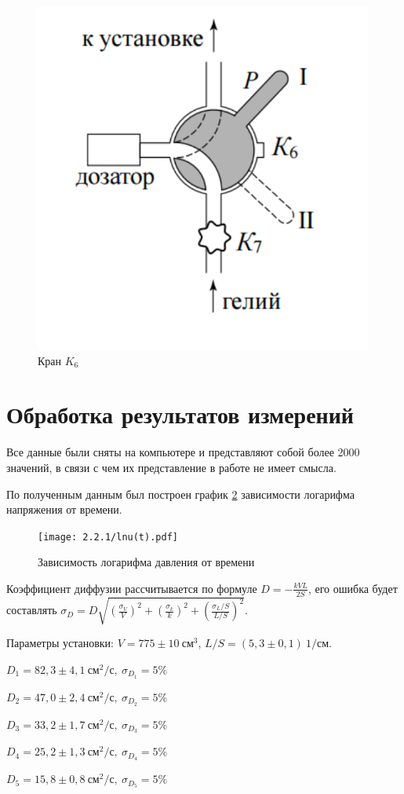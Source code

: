 \documentclass[a4paper,12pt]{article} %
\begin{document}
\begin{figure}[H]
    \centering
    \includegraphics[width=7.5 cm]{crane.PNG}
    \caption{Кран $K_6$}
    \label{fig:vac}
\end{figure}

\section{Обработка результатов измерений}

Все данные были сняты на компьютере и представляют собой более 2000 значений, в связи с чем их представление в работе не имеет смысла.

По полученным данным был построен график \ref{lnu(t)} зависимости логарифма напряжения от времени.

\begin{figure}[H]
    \centering
    \texttt{[image: 2.2.1/lnu(t).pdf]}
    \caption{Зависимость логарифма давления от времени}
    \label{lnu(t)}
\end{figure}

Коэффициент диффузии рассчитывается по формуле $\displaystyle D = -\frac{kVL}{2S}$, его ошибка будет составлять $\displaystyle \sigma_D = D\sqrt{\left(\frac{\sigma_V}{V}\right)^2+\left(\frac{\sigma_k}{k}\right)^2+\left(\frac{\sigma_L/S}{L/S}\right)^2}$.

Параметры установки: $V = 775 \pm 10\ \mbox{см}^3$, $L/S = (5,3 \pm 0,1)\ 1/$см.

\begin{center}
$\displaystyle    D_1 = 82,3 \pm 4,1\ \mbox{см}^2/\mbox{с},\ \sigma_{D_1} = 5\%$
\break

$\displaystyle     D_2 = 47,0 \pm 2,4\  \mbox{см}^2/\mbox{с},\ \sigma_{D_2} = 5\%$
\break

$\displaystyle     D_3 = 33,2 \pm 1,7\  \mbox{см}^2/\mbox{с},\  \sigma_{D_3} = 5\%$
\break

$\displaystyle     D_4 = 25,2 \pm 1,3\  \mbox{см}^2/\mbox{с},\  \sigma_{D_4} = 5\%$
\break

$\displaystyle     D_5 = 15,8 \pm 0,8\ \mbox{см}^2/\mbox{с},\  \sigma_{D_5} = 5\%$
\end{center}
\end{document}
